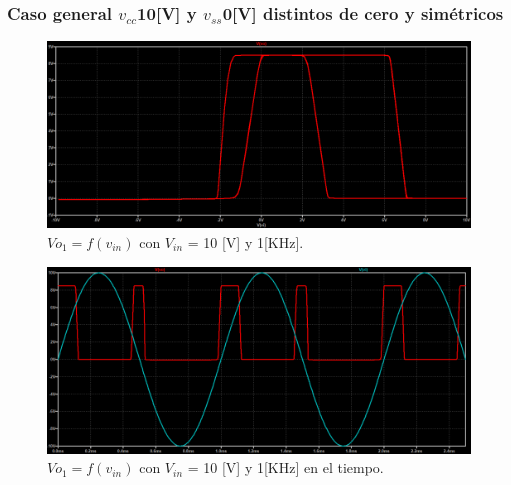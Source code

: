 \subsubsection{Caso general $v_{cc}$10[V] y $v_{ss}$0[V] distintos de cero y simétricos}
\begin{figure}[H]
	\centering
	\includegraphics[width=1\textwidth]{figuras/caso_vss=0_histeresis.png}
	\caption{$Vo_1= f(v_{in})$ con $V_{in}$ = 10 [V] y 1[KHz].}
\end{figure}
\begin{figure}[H]
	\centering
	\includegraphics[width=1\textwidth]{figuras/caso_vss=0_histeresis_time.png}
	\caption{$Vo_1= f(v_{in})$ con $V_{in}$ = 10 [V] y 1[KHz] en el tiempo.}
\end{figure}